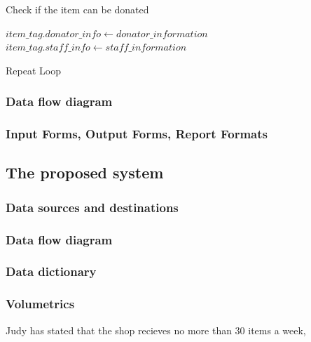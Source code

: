 \begin{algorithm}[H]
    \caption{Check if the item can be donated}
\begin{algorithmic}[1]
\EndFunction
\Else
\State $item\_tag.donator\_info \gets  donator\_information$
\State $item\_tag.staff\_info \gets  staff\_information$
\EndIf
\end{algorithmic}
\end{algorithm}

\begin{algorithm}[H]
\label{fig:repeat_pseudo_example}
    \caption{Repeat Loop}
\begin{algorithmic}[1]
\State
\Repeat
\end{algorithmic}
\end{algorithm}

\subsubsection{Data flow diagram}

\subsubsection{Input Forms, Output Forms, Report Formats}

\subsection{The proposed system}

\subsubsection{Data sources and destinations}

\subsubsection{Data flow diagram}

\subsubsection{Data dictionary}

\subsubsection{Volumetrics}
Judy has stated that the shop recieves no more than 30 items a week, 
